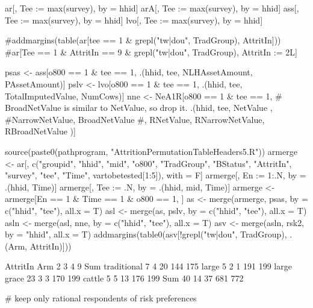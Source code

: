 \begin{Schunk}
\begin{Sinput}
ar[, Tee := max(survey), by = hhid]
arA[, Tee := max(survey), by = hhid]
ass[, Tee := max(survey), by = hhid]
lvo[, Tee := max(survey), by = hhid]
\end{Sinput}
\end{Schunk}
\begin{Schunk}
\begin{Sinput}
#addmargins(table(ar[tee == 1 & grepl("tw|dou", TradGroup), AttritIn]))
#ar[Tee == 1 & AttritIn == 9 & grepl("tw|dou", TradGroup), AttritIn := 2L]
\end{Sinput}
\end{Schunk}
\begin{Schunk}
\begin{Sinput}
psas <- ass[o800 == 1 & tee == 1, 
  .(hhid, tee, NLHAssetAmount, PAssetAmount)]
pslv <- lvo[o800 == 1 & tee == 1, 
  .(hhid, tee, TotalImputedValue, NumCows)]
nne <- NeA1R[o800 == 1 & tee == 1, 
  # BroadNetValue is similar to NetValue, so drop it.
  .(hhid, tee, NetValue , #NarrowNetValue, 
  BroadNetValue
  #, RNetValue, RNarrowNetValue, RBroadNetValue
  )]
\end{Sinput}
\end{Schunk}
\begin{Schunk}
\begin{Sinput}
source(paste0(pathprogram, "AttritionPermutationTableHeaders5.R"))
armerge <- ar[, c("groupid", "hhid", "mid", "o800", "TradGroup", 
  "BStatus", "AttritIn", "survey", "tee", "Time", vartobetested[1:5]), with = F]
armerge[, En := 1:.N, by = .(hhid, Time)]
armerge[, Tee := .N, by = .(hhid, mid, Time)]
armerge <- armerge[En == 1 & Time == 1 & o800 == 1, ]
as <- merge(armerge, psas, by = c("hhid", "tee"), all.x = T)
asl <- merge(as, pslv, by = c("hhid", "tee"), all.x = T)
asln <- merge(asl, nne, by = c("hhid", "tee"), all.x = T)
asv <- merge(asln, rsk2, by = "hhid", all.x = T)
addmargins(table0(asv[!grepl("tw|dou", TradGroup), .(Arm, AttritIn)]))
\end{Sinput}
\begin{Soutput}
             AttritIn
Arm             2   3   4   9 Sum
  traditional   7   4  20 144 175
  large         5   2   1 191 199
  large grace  23   3   3 170 199
  cattle        5   5  13 176 199
  Sum          40  14  37 681 772
\end{Soutput}
\begin{Sinput}
# keep only rational respondents of risk preferences
\end{Sinput}
\end{Schunk}
